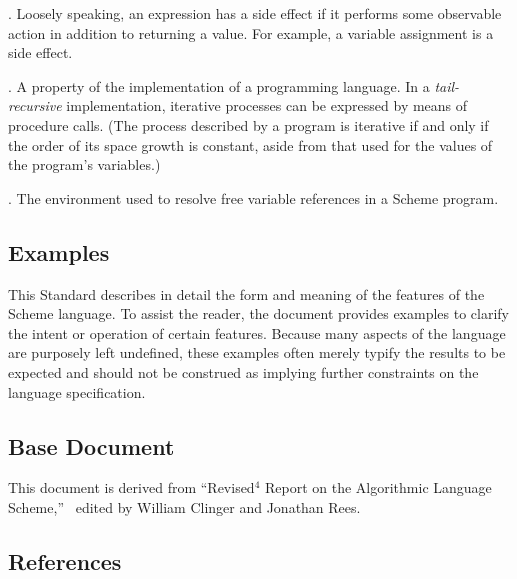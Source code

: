 .  Loosely speaking, an expression has a side
effect if it performs some observable action in addition to returning
a value.  For example, a variable assignment is a side effect.

. A property of the implementation of a
programming language.  In a {\it tail-recursive} implementation,
iterative processes can be expressed by means of procedure calls.
(The process described by a program is iterative if and only if the
order of its space growth is constant, aside from that used for the
values of the program's variables.)

.  The environment used to resolve
free variable references in a Scheme program.


\subsection*{Examples}

\vest This Standard describes in detail the form and meaning of the
features of the Scheme language.  To assist the reader, the document
provides examples to clarify the intent or operation of certain
features.  Because many aspects of the language are purposely left
undefined, these examples often merely typify the results to be
expected and should not be construed as implying further constraints
on the language specification.


\subsection*{Base Document}

\vest This document is derived from ``Revised$^4$ Report on the
Algorithmic Language Scheme,''~\cite{R4RS} edited by William Clinger
and Jonathan Rees.


\subsection*{References}


